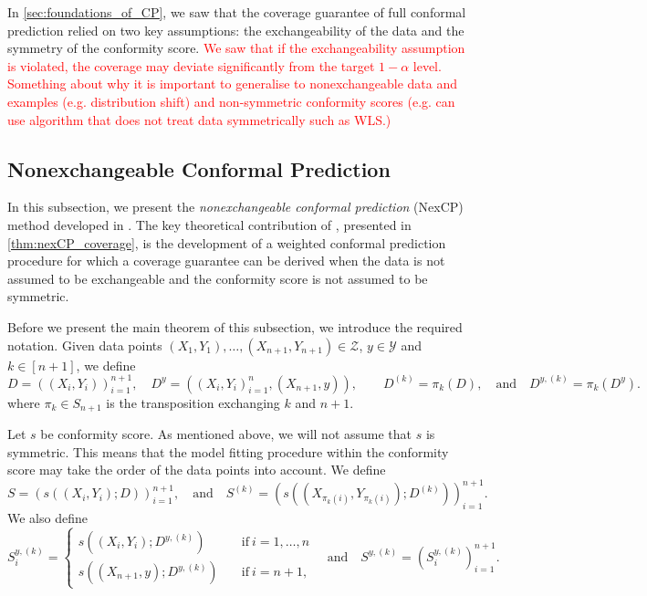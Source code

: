 \documentclass[11pt, titlepage]{article} %
\numberwithin{equation}{section}
\theoremstyle{definition}
\numberwithin{theorem}{section}
\numberwithin{lemma}{section}
\numberwithin{corollary}{section}
\numberwithin{proposition}{section}
\numberwithin{definition}{section}
\numberwithin{remark}{section}
\begin{document}
In \cref{sec:foundations_of_CP}, we saw that the coverage guarantee of full conformal prediction relied on two key assumptions: the exchangeability of the data and the symmetry of the conformity score. \textcolor{red}{We saw that if the exchangeability assumption is violated, the coverage may deviate significantly from the target \(1-\alpha\) level.} \textcolor{red}{Something about why it is important to generalise to nonexchangeable data and examples (e.g. distribution shift) and non-symmetric conformity scores (e.g. can use algorithm that does not treat data symmetrically such as WLS.)} 

\subsection{Nonexchangeable Conformal Prediction}
\label{subsec:nex_CP}

In this subsection, we present the \textit{nonexchangeable conformal prediction} (NexCP) method developed in \cite{barber2023conformalbeyondexch}. The key theoretical contribution of \cite{barber2023conformalbeyondexch}, presented in \cref{thm:nexCP_coverage}, is the development of a weighted conformal prediction procedure for which a coverage guarantee can be derived when the data is not assumed to be exchangeable and the conformity score is not assumed to be symmetric. \vskip5pt

\noindent
Before we present the main theorem of this subsection, we introduce the required notation. Given data points \((X_1, Y_1), \ldots, (X_{n+1}, Y_{n+1}) \in \mathcal{Z}\), \(y \in \mathcal{Y}\) and \(k \in [n+1]\), we define \[D = ((X_i, Y_i))_{i=1}^{n+1}, \quad D^{y} = ((X_i, Y_i)_{i=1}^n, (X_{n+1}, y)), \quad \quad D^{(k)} = \pi_k(D), \quad \mathrm{and} \quad D^{y, (k)} = \pi_k(D^{y}). \] where \(\pi_k \in S_{n+1}\) is the transposition exchanging \(k\) and \(n+1\). \vskip5pt

\noindent
Let \(s\) be  conformity score. As mentioned above, we will not assume that \(s\) is symmetric. This means that the model fitting procedure within the conformity score may take the order of the data points into account.  We define \[S = (s((X_i, Y_i); D))_{i=1}^{n+1}, \quad \mathrm{and} \quad S^{(k)} = ( s(( X_{\pi_k(i)}, Y_{\pi_k(i)} ); D^{(k)}) )_{i=1}^{n+1}.\] We also define \[S_i^{y, (k)} = \begin{cases}
    s(( X_i, Y_i ); D^{y, (k)}) \quad &\mathrm{if} \ i = 1, \ldots, n \\
    s(( X_{n+1}, y ); D^{y, (k)}) \quad &\mathrm{if} \ i = n+1,
\end{cases} \quad \mathrm{and} \quad S^{y, (k)} = (S_i^{y,(k)})_{i=1}^{n+1}.\]
\end{document}
